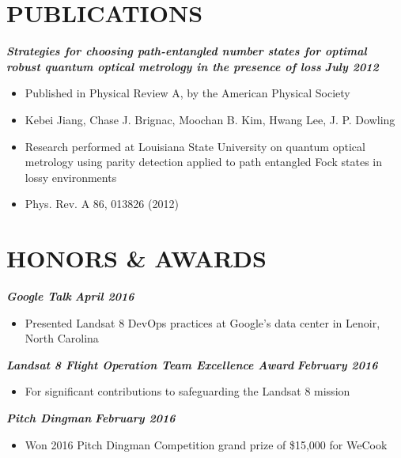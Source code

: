 \documentclass{res}
\begin{document}
\begin{resume}
\section{PUBLICATIONS}
	{\bfseries {\em Strategies for choosing path-entangled number states for optimal\\robust quantum optical metrology in the presence of loss}} \hfill  {\bfseries {\em July 2012}}
	 	\begin{itemize}  \itemsep -2pt
		\item Published in Physical Review A, by the American Physical Society
		\item Kebei Jiang, Chase J. Brignac, Moochan B. Kim, Hwang Lee, J. P. Dowling
		\item Research performed at Louisiana State University on quantum optical metrology using parity detection applied to path entangled Fock states in lossy environments
		\item Phys. Rev. A 86, 013826 (2012)
		\end{itemize}

\section{HONORS \& AWARDS}
	{\bfseries {\em Google Talk}} \hfill {\bfseries {\em April 2016}} \
		\begin{itemize} \itemsep -2pt
		\item Presented Landsat 8 DevOps practices at Google's data center in Lenoir, North Carolina
		\end{itemize}
  	{\bfseries {\em Landsat 8 Flight Operation Team Excellence Award}} \hfill {\bfseries {\em February 2016}} \
		\begin{itemize} \itemsep -2pt
		\item For significant contributions to safeguarding the Landsat 8 mission
		\end{itemize}
	{\bfseries {\em Pitch Dingman}} \hfill {\bfseries {\em February 2016}} \
		\begin{itemize} \itemsep -2pt
		\item Won 2016 Pitch Dingman Competition grand prize of \$15,000 for WeCook
		\end{itemize}


\end{resume}
\end{document}
